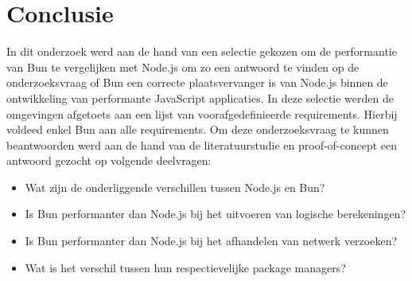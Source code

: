 
\chapter{Conclusie}%
\label{ch:conclusie}


In dit onderzoek werd aan de hand van een selectie gekozen om de performantie van Bun te vergelijken met Node.js om zo een antwoord te vinden op de 
onderzoeksvraag of Bun een correcte plaatsvervanger is van Node.js binnen de ontwikkeling van performante JavaScript applicaties.
In deze selectie werden de omgevingen afgetoets aan een lijst van voorafgedefinieerde requirements. Hierbij voldeed enkel Bun aan alle requirements.
Om deze onderzoeksvraag te kunnen beantwoorden werd aan de hand van de literatuurstudie en proof-of-concept een antwoord gezocht op volgende deelvragen:
\begin{itemize}
    \item Wat zijn de onderliggende verschillen tussen Node.js en Bun?
    \item Is Bun performanter dan Node.js bij het uitvoeren van logische berekeningen?
    \item Is Bun performanter dan Node.js bij het afhandelen van netwerk verzoeken?
    \item Wat is het verschil tussen hun respectievelijke package managers?
  \end{itemize}

